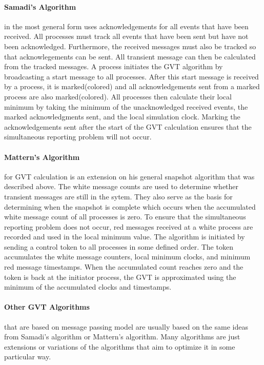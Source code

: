 \documentclass[11pt]{book}
\begin{document}
\paragraph{Samadi's Algorithm}\cite{samadi-85} in the most general form uses acknowledgements
for all events that have been received. All processes must track all events that have been
sent but have not been acknowledged. Furthermore, the received messages must also be tracked
so that acknowlegements can be sent. All transient message can then be calculated from the
tracked messages. A process initiates the GVT algorithm by broadcasting a start message to
all processes. After this start message is received by a process, it is marked(colored) and
all acknowledgements sent from a marked process are also marked(colored). All processes then
calculate their local minimum by taking the minimum of the unacknowledged received events,
the marked acknowledgments sent, and the local simulation clock. Marking the acknowledgements
sent after the start of the GVT calculation ensures that the simultaneous reporting problem
will not occur.

\paragraph{Mattern's Algorithm}\cite{mattern-93} for GVT calculation is an extension on his
general snapshot algorithm that was described above. The white message counts are used to
determine whether transient messages are still in the sytem. They also serve as the basis
for determining when the snapshot is complete which occurs when the accumulated white message
count of all processes is zero. To ensure that the simultaneous reporting problem does not
occur, red messages received at a white process are recorded and used in the local minimum
value. The algorithm is initiated by sending a control token to all processes in some defined
order. The token accumulates the white message counters, local minimum clocks, and minimum
red message timestamps. When the accumulated count reaches zero and the token is back at
the initiator process, the GVT is approximated using the minimum of the accumulated clocks
and timestamps.

\paragraph{Other GVT Algorithms} that are based on message passing model are usually based
on the same ideas from Samadi's algorithm or Mattern's algorithm. Many algorithms are just
extensions or variations of the algorithms that aim to optimize it in some particular way.
\end{document}
